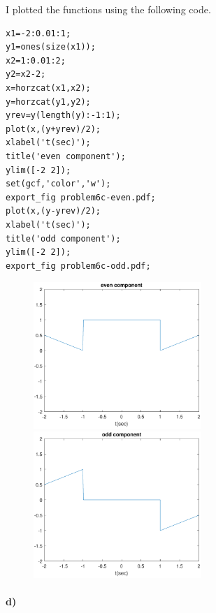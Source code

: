 \documentclass[12pt]{article}
\begin{document}
I plotted the functions using the following code.
\begin{verbatim}
x1=-2:0.01:1;
y1=ones(size(x1));
x2=1:0.01:2;
y2=x2-2;
x=horzcat(x1,x2);
y=horzcat(y1,y2);
yrev=y(length(y):-1:1);
plot(x,(y+yrev)/2);
xlabel('t(sec)');
title('even component');
ylim([-2 2]);
set(gcf,'color','w');
export_fig problem6c-even.pdf;
plot(x,(y-yrev)/2);
xlabel('t(sec)');
title('odd component');
ylim([-2 2]);
export_fig problem6c-odd.pdf;
\end{verbatim}
\begin{figure}[H]
    \begin{center}
        \includegraphics[width=2.5in]{problem6c-even.pdf}
		\includegraphics[width=2.5in]{problem6c-odd.pdf}
    \end{center}
\end{figure}

\paragraph{d)}
\end{document}
